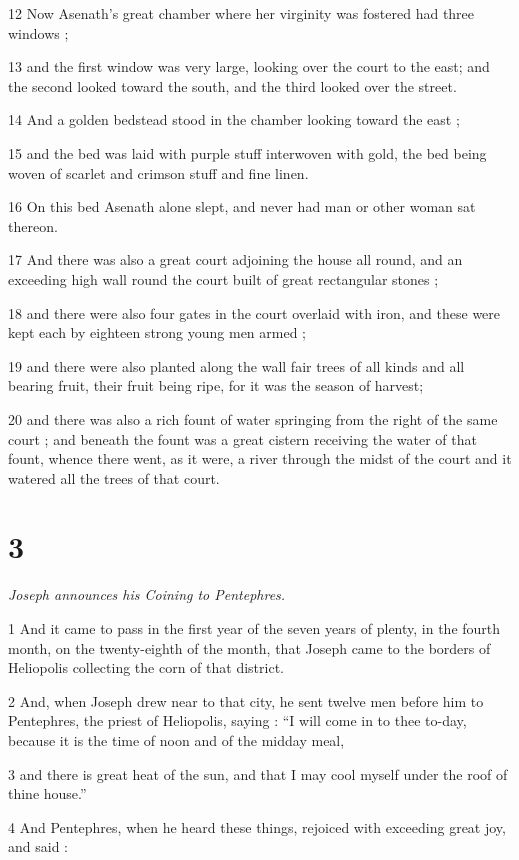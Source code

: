 12 Now Asenath's great chamber where her virginity was fostered had three windows ; 

13 and the first window was very large, looking over the court to the east; and the second looked toward the south, and the third looked over the street. 

14 And a golden bedstead stood in the chamber looking toward the east ; 

15 and the bed was laid with purple stuff interwoven with gold, the bed being woven of scarlet and crimson stuff and fine linen. 

16 On this bed Asenath alone slept, and never had man or other woman sat thereon. 

17 And there was also a great court adjoining the house all round, and an exceeding high wall round the court built of great rectangular stones ; 

18 and there were also four gates in the court overlaid with iron, and these were kept each by eighteen strong young men armed ; 

19 and there were also planted along the wall fair trees of all kinds and all bearing fruit, their fruit being ripe, for it was the season of harvest; 

20 and there was also a rich fount of water springing from the right of the same court ; and beneath the fount was a great cistern receiving the water of that fount, whence there went, as it were, a river through the midst of the court and it watered all the trees of that court. 

\chapter{3}

\textit{Joseph announces his Coining to Pentephres.}

1 And it came to pass in the first year of the seven years of plenty, in the fourth month, on the twenty-eighth of the month, that Joseph came to the borders of Heliopolis collecting the corn of that district. 

2 And, when Joseph drew near to that city, he sent twelve men before him to Pentephres, the priest of Heliopolis, saying : “I will come in to thee to-day, because it is the time of noon and of the midday meal, 

3 and there is great heat of the sun, and that I may cool myself under the roof of thine house.” 

4 And Pentephres, when he heard these things, rejoiced with exceeding great joy, and said : 

